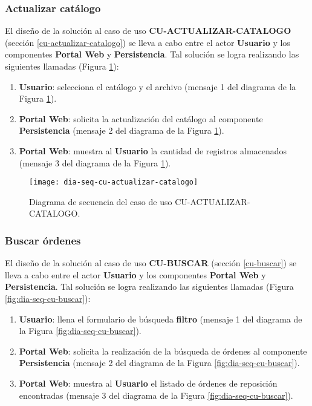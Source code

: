 
\subsubsection{Actualizar catálogo}
El diseño de la solución al caso de uso \textbf{CU-ACTUALIZAR-CATALOGO} (sección \ref{cu-actualizar-catalogo}) se lleva a cabo entre el actor \textbf{Usuario} y los componentes \textbf{Portal Web} y \textbf{Persistencia}. Tal solución se logra realizando las siguientes llamadas (Figura \ref{fig:dia-seq-cu-actualizar-catalogo}):
\begin{enumerate}
	\item \textbf{Usuario}: selecciona el catálogo y el archivo (mensaje 1 del diagrama de la Figura \ref{fig:dia-seq-cu-actualizar-catalogo}).
	\item \textbf{Portal Web}: solicita la actualización del catálogo al componente \textbf{Persistencia} (mensaje 2 del diagrama de la Figura \ref{fig:dia-seq-cu-actualizar-catalogo}).
	\item \textbf{Portal Web}: muestra al \textbf{Usuario} la cantidad de registros almacenados (mensaje 3 del diagrama de la Figura \ref{fig:dia-seq-cu-actualizar-catalogo}).
\end{enumerate}

\begin{figure}[h]
	\centering
	\texttt{[image: dia-seq-cu-actualizar-catalogo]}
	\caption{Diagrama de secuencia del caso de uso CU-ACTUALIZAR-CATALOGO.}
	\label{fig:dia-seq-cu-actualizar-catalogo}
\end{figure}


\subsubsection{Buscar órdenes}
El diseño de la solución al caso de uso \textbf{CU-BUSCAR} (sección \ref{cu-buscar}) se lleva a cabo entre el actor \textbf{Usuario} y los componentes \textbf{Portal Web} y \textbf{Persistencia}. Tal solución se logra realizando las siguientes llamadas (Figura \ref{fig:dia-seq-cu-buscar}):
\begin{enumerate}
	\item \textbf{Usuario}: llena el formulario de búsqueda \textbf{filtro} (mensaje 1 del diagrama de la Figura \ref{fig:dia-seq-cu-buscar}).
	\item \textbf{Portal Web}: solicita la realización de la búsqueda de órdenes al componente \textbf{Persistencia} (mensaje 2 del diagrama de la Figura \ref{fig:dia-seq-cu-buscar}).
	\item \textbf{Portal Web}: muestra al \textbf{Usuario} el listado de órdenes de reposición encontradas (mensaje 3 del diagrama de la Figura \ref{fig:dia-seq-cu-buscar}).
\end{enumerate}

